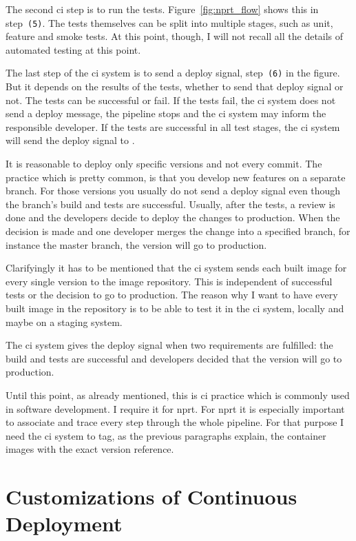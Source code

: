 The second \gls{ci} step is to run the tests. Figure~\ref{fig:nprt_flow} shows this in
step~\texttt{(5)}. The tests themselves can be split into multiple stages, such as unit,
feature and smoke tests. At this point, though, I will not recall all the details of
automated testing at this point.

The last step of the \gls{ci} system is to send a deploy signal, step~\texttt{(6)} in the
figure. But it depends on the results of the tests, whether to send that deploy signal or
not. The tests can be successful or fail. If the tests fail, the \gls{ci} system does not
send a deploy message, the pipeline stops and the \gls{ci} system may inform the
responsible developer. If the tests are successful in all test stages, the \gls{ci} system
will send the deploy signal to \deployer.

It is reasonable to deploy only specific versions and not every commit. The practice which
is pretty common, is that you develop new features on a separate branch. For those
versions you usually do not send a deploy signal even though the branch's build and tests
are successful. Usually, after the tests, a review is done and the developers decide to
deploy the changes to production. When the decision is made and one developer merges the
change into a specified branch, for instance the master branch, the version will go to
production.

Clarifyingly it has to be mentioned that the \gls{ci} system sends each built image for every single
version to the image repository. This is independent of successful tests or the decision
to go to production. The reason why I want to have every built image in the repository is
to be able to test it in the \gls{ci} system, locally and maybe on a staging system.

The \gls{ci} system gives the deploy signal when two requirements are fulfilled: the build
and tests are successful and developers decided that the version will go to production.

Until this point, as already mentioned, this is \gls{ci} practice which is commonly used
in software development. I require it for \gls{nprt}. For \gls{nprt} it is especially
important to associate and trace every step through the whole pipeline. For that purpose I
need the \gls{ci} system to tag, as the previous paragraphs explain, the container images
with the exact version reference.

\section{Customizations of Continuous Deployment}

